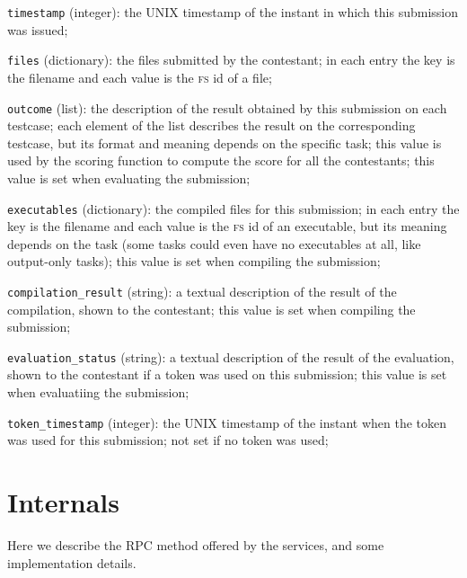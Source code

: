 \documentclass[a4paper,8pt]{amsart}
\newcommand{\FS}{\textsc{fs}}
\newenvironment{squishlist}{%
  \begin{list}{\textbullet}%
    { \setlength{\itemsep}{0pt}%
      \setlength{\parsep}{3pt}%
      \setlength{\topsep}{3pt}%
      \setlength{\partopsep}{0pt}%
      \setlength{\leftmargin}{1.5em}%
      \setlength{\labelwidth}{1em}%
      \setlength{\labelsep}{0.5em} }%
}{\end{list}}
\newcommand{\id}[1]{\texttt{#1}}
\begin{document}
\begin{multicols}{2}
\begin{squishlist}
  \item \id{timestamp} (integer): the UNIX timestamp of the instant in
    which this submission was issued;

  \item \id{files} (dictionary): the files submitted by the
    contestant; in each entry the key is the filename and each value
    is the \FS{} id of a file;

  \item \id{outcome} (list): the description of the result obtained by
    this submission on each testcase; each element of the list
    describes the result on the corresponding testcase, but its format
    and meaning depends on the specific task; this value is used by
    the scoring function to compute the score for all the contestants;
    this value is set when evaluating the submission;

  \item \id{executables} (dictionary): the compiled files for this
    submission; in each entry the key is the filename and each value
    is the \FS{} id of an executable, but its meaning depends on the
    task (some tasks could even have no executables at all, like
    output-only tasks); this value is set when compiling the
    submission;

  \item \id{compilation\_result} (string): a textual description of
    the result of the compilation, shown to the contestant; this value
    is set when compiling the submission;

  \item \id{evaluation\_status} (string): a textual description of the
    result of the evaluation, shown to the contestant if a token was
    used on this submission; this value is set when evaluatiing the
    submission;

  \item \id{token\_timestamp} (integer): the UNIX timestamp of the
    instant when the token was used for this submission; not set if no
    token was used;

  \end{squishlist}

  \section{Internals}

  Here we describe the RPC method offered by the services, and some
  implementation details.


\end{multicols}
\end{document}
